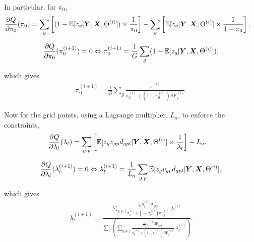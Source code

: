 \documentclass[10pt]{article}
\newcommand{\Exp}{\mathbb{E}} %
\newcommand{\BF}{{\text{BF}}} %
\newcommand{\Xv}{\mbox{\boldmath$X$}}
\newcommand{\Yv}{\mbox{\boldmath$Y$}}
\begin{document}
In particular, for $\pi_0$,
\begin{equation*}
  \begin{aligned}
    \frac{\partial Q}{\partial \pi_0}(\pi_0) &= \sum_g \left[ (1-\Exp[z_g | \Yv, \Xv, \Theta^{(i)}]) \times \frac{1}{\pi_0} \right] - \sum_g \left[ \Exp[z_g | \Yv, \Xv, \Theta^{(i)}] \times \frac{1}{1-\pi_0} \right],
  \end{aligned}
\end{equation*}

\begin{equation*}
  \begin{aligned}
    \frac{\partial Q}{\partial \pi_0}(\pi_0^{(i+1)}) = 0 \Leftrightarrow \pi_0^{(i+1)} = \frac{1}{G} \sum_g (1 - \Exp[z_g | \Yv, \Xv, \Theta^{(i)}]),
  \end{aligned}
\end{equation*}

which gives
\begin{equation}
  \begin{aligned}
    \pi_0^{(i+1)} = \frac{1}{G} \sum_g \frac{\pi_0^{(i)}}{\pi_0^{(i)} + (1-\pi_0^{(i)}) \BF_g^{(i)}}.
  \end{aligned}
\end{equation}

Now for the grid points, using a Lagrange multiplier, $L_a$, to enforce the constraints,
\begin{equation*}
  \begin{aligned}
    \frac{\partial Q}{\partial \lambda_l}(\lambda_l) &= \sum_{g,p} \left[ \Exp[z_g v_{gp} d_{gpl} | \Yv, \Xv, \Theta^{(i)}] \times \frac{1}{\lambda_l} \right] - L_a,
  \end{aligned}
\end{equation*}

\begin{equation*}
  \begin{aligned}
    \frac{\partial Q}{\partial \lambda_l}(\lambda_l^{(i+1)}) = 0 \Leftrightarrow \lambda_l^{(i+1)} = \frac{1}{L_a} \sum_{g,p} \Exp[z_g v_{gp} d_{gpl} | \Yv, \Xv, \Theta^{(i)}],
  \end{aligned}
\end{equation*}

which gives
\begin{equation}
  \begin{aligned}
    \lambda_l^{(i+1)} = \frac{\sum_{g,p,j} \frac{\frac{1}{m_g} \eta_j^{(i)} \BF_{gpjl}}{\pi_0^{(i)} + (1-\pi_0^{(i)}) \BF_g^{(i)}} \; \lambda_l^{(i)}}{\sum_{l'} \left( \sum_{g,p,j} \frac{\frac{1}{m_g} \eta_j^{(i)} \BF_{gpjl'}}{\pi_0^{(i)} + (1-\pi_0^{(i)}) \BF_g^{(i)}} \; \lambda_{l'}^{(i)} \right)}.
  \end{aligned}
\end{equation}
\end{document}
